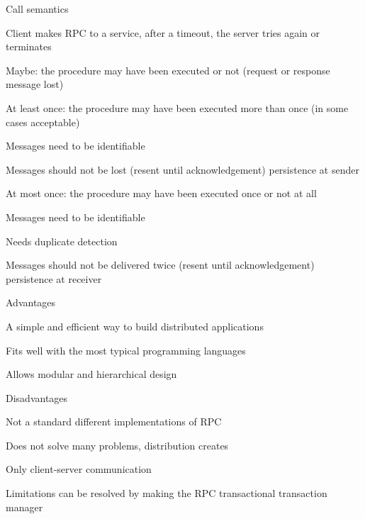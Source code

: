 	\enumend
	\item Call semantics
	\enumstart
		\item Client makes RPC to a service, after a timeout, the server tries again or terminates
		\item Maybe: the procedure may have been executed or not (request or response message lost)
		\item At least once: the procedure may have been executed more than once (in some cases acceptable)
		\enumstart
			\item Messages need to be identifiable
			\item Messages should not be lost (resent until acknowledgement) \arrow persistence at sender
		\enumend
		\item At most once: the procedure may have been executed once or not at all
		\enumstart
			\item Messages need to be identifiable
			\item Needs duplicate detection
			\item Messages should not be delivered twice (resent until acknowledgement) \arrow persistence at receiver
		\enumend
	\enumend
	\item Advantages
	\enumstart
		\item A simple and efficient way to build distributed applications
		\item Fits well with the most typical programming languages
		\item Allows modular and hierarchical design
	\enumend
	\item Disadvantages
	\enumstart
		\item Not a standard \arrow different implementations of RPC
		\item Does not solve many problems, distribution creates
		\item Only client-server communication
	\enumend
	\item Limitations can be resolved by making the RPC transactional \arrow transaction manager
\enumend
